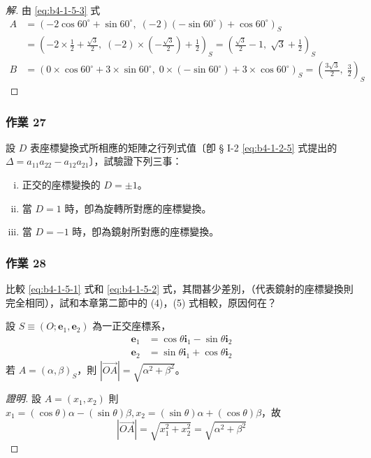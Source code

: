 \begin{proof}[解]
由 \eqref{eq:b4-1-5-3} 式
\begin{align*}
A &= \left(-2\cos 60^\circ + \sin 60^\circ, \; (-2)(-\sin 60^\circ) + \cos 60^\circ\right)_S \\
&= \left(-2 \times \frac{1}{2} + \frac{\sqrt{3}}{2}, \; (-2) \times \left(-\frac{\sqrt{3}}{2}\right) + \frac{1}{2}\right)_S = \left(\frac{\sqrt{3}}{2} - 1, \; \sqrt{3} + \frac{1}{2}\right)_S \\
B &= \left(0 \times \cos 60^\circ + 3 \times \sin 60^\circ, \; 0 \times (-\sin 60^\circ) + 3 \times \cos 60^\circ\right)_S = \left(\frac{3\sqrt{3}}{2}, \; \frac{3}{2}\right)_S
\end{align*}
\end{proof}

\subsubsection*{作業 27}
設 $D$ 表座標變換式所相應的矩陣之行列式值〔卽 § I-2 \eqref{eq:b4-1-2-5} 式提出的 $\Delta = a_{11}a_{22} - a_{12}a_{21}$〕，試驗證下列三事：
\begin{enumerate}[(i)]
  \item 正交的座標變換的 $D = \pm 1$。
  \item 當 $D = 1$ 時，卽為旋轉所對應的座標變換。
  \item 當 $D = -1$ 時，卽為鏡射所對應的座標變換。
\end{enumerate}

\subsubsection*{作業 28}
比較 \eqref{eq:b4-1-5-1} 式和 \eqref{eq:b4-1-5-2} 式，其間甚少差別，（代表鏡射的座標變換則完全相同），試和本章第二節中的 (4)，(5) 式相較，原因何在？

\begin{example}[例 11]
設 $S \equiv (O; \mathbf{e}_1, \mathbf{e}_2)$ 為一正交座標系，
\begin{align*}
\mathbf{e}_1 &= \cos\theta\mathbf{i}_1 - \sin\theta\mathbf{i}_2 \\
\mathbf{e}_2 &= \sin\theta\mathbf{i}_1 + \cos\theta\mathbf{i}_2
\end{align*}
若 $A = (\alpha, \beta)_S$，則 $|\vec{OA}| = \sqrt{\alpha^2 + \beta^2}$。
\end{example}

\begin{proof}[證明]
設 $A = (x_1, x_2)$ 則 $x_1 = (\cos\theta)\alpha - (\sin\theta)\beta, x_2 = (\sin\theta)\alpha + (\cos\theta)\beta$，故
\[ |\vec{OA}| = \sqrt{x_1^2 + x_2^2} = \sqrt{\alpha^2 + \beta^2} \]
\end{proof}

